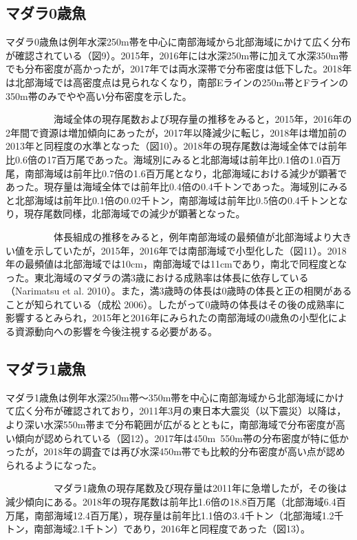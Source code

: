 \documentclass[11pt]{article} %
\begin{document}
\begin{linenumbers}
\subsection{マダラ0歳魚}
マダラ0歳魚は例年水深250m帯を中心に南部海域から北部海域にかけて広く分布が確認されている（図9）。2015年，2016年には水深250m帯に加えて水深350m帯でも分布密度が高かったが，2017年では両水深帯で分布密度は低下した。2018年は北部海域では高密度点は見られなくなり，南部Eラインの250m帯とFラインの350m帯のみでやや高い分布密度を示した。

\ \ \ \ \ \ \ \ \ \ 
海域全体の現存尾数および現存量の推移をみると，2015年，2016年の2年間で資源は増加傾向にあったが，2017年以降減少に転じ，2018年は増加前の2013年と同程度の水準となった（図10）。2018年の現存尾数は海域全体では前年比0.6倍の17百万尾であった。海域別にみると北部海域は前年比0.1倍の1.0百万尾，南部海域は前年比0.7倍の1.6百万尾となり，北部海域における減少が顕著であった。現存量は海域全体では前年比0.4倍の0.4千トンであった。海域別にみると北部海域は前年比0.1倍の0.02千トン，南部海域は前年比0.5倍の0.4千トンとなり，現存尾数同様，北部海域での減少が顕著となった。

\ \ \ \ \ \ \ \ \ \ 
体長組成の推移をみると，例年南部海域の最頻値が北部海域より大きい値を示していたが，2015年，2016年では南部海域で小型化した（図11）。2018年の最頻値は北部海域では10cm，南部海域では11cmであり，南北で同程度となった。東北海域のマダラの満3歳における成熟率は体長に依存している（Narimatsu et al. 2010）。また，満3歳時の体長は0歳時の体長と正の相関があることが知られている（成松 2006）。したがって0歳時の体長はその後の成熟率に影響するとみられ，2015年と2016年にみられたの南部海域の0歳魚の小型化による資源動向への影響を今後注視する必要がある。

\subsection{マダラ1歳魚}
マダラ1歳魚は例年水深250m帯～350m帯を中心に南部海域から北部海域にかけて広く分布が確認されており，2011年3月の東日本大震災（以下震災）以降は，より深い水深550m帯まで分布範囲が広がるとともに，南部海域で分布密度が高い傾向が認められている（図12）。2017年は450m~550m帯の分布密度が特に低かったが，2018年の調査では再び水深450m帯でも比較的分布密度が高い点が認められるようになった。

\ \ \ \ \ \ \ \ \ \ 
マダラ1歳魚の現存尾数及び現存量は2011年に急増したが，その後は減少傾向にある。2018年の現存尾数は前年比1.6倍の18.8百万尾（北部海域6.4百万尾，南部海域12.4百万尾），現存量は前年比1.1倍の3.4千トン（北部海域1.2千トン，南部海域2.1千トン）であり，2016年と同程度であった（図13）。


\end{linenumbers}
\end{document}
